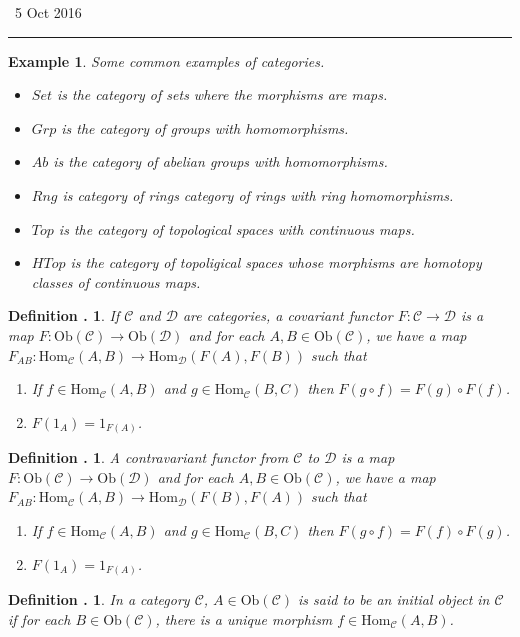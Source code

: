 \documentclass[twoside]{report}
\newcommand{\Ob}{\textrm{Ob}}
\newcommand{\Hom}{\textrm{Hom}}
\newcommand{\fanC}{\mathscr{C}}
\newcommand{\fanD}{\mathscr{D}}
\newcounter{Lecture}
\newcommand{\newLec}[1]{
  \stepcounter{Lecture}
  \noindent{\Large\bf Lecture \arabic{Lecture}} \, #1 \hfill  \rule[1ex]{2.5in}{.1pt} \vspace{1em}
}
\theoremstyle{myts}
\newcounter{c}[Lecture]
\newtheorem{dfn}[c]{Definition \arabic{Lecture}.}
\newtheorem*{epl}{Example}
\newcounter{ex}
\begin{document}
\newLec{5 Oct 2016}

\begin{epl} Some common examples of categories.
  \begin{itemize}
    \item \(Set\) is the category of sets where the morphisms are maps.
    \item \(Grp\) is the category of groups with homomorphisms.
    \item \(Ab\) is the category of abelian groups with homomorphisms.
    \item \(Rng\) is category of rings category of rings with ring homomorphisms.
    \item \(Top\) is the category of topological spaces with continuous maps.
    \item \(HTop\) is the category of topoligical spaces whose morphisms are homotopy classes of continuous maps.
  \end{itemize}
\end{epl}

\begin{dfn}
  If $\fanC$ and $\fanD$ are categories, a \emph{covariant functor} \( F : \fanC \to \fanD \) is a map \( F : \Ob(\fanC) \to \Ob (\fanD) \) and for each \( A, B \in \Ob(\fanC) \), we have a map \( F_{AB} : \Hom_\fanC(A,B) \to \Hom_\fanD(F(A), F(B) ) \) such that
  \begin{enumerate}[(1)]
    \item If \( f\in \Hom_\fanC(A,B) \) and \( g\in \Hom_\fanC (B,C) \) then \( F(g\circ f) = F(g) \circ F(f) \).
    \item \( F(1_A) = 1_{F(A)} \).
  \end{enumerate}
\end{dfn}

\begin{dfn}
  A \emph{contravariant functor} from $\fanC$ to $\fanD$ is a map \( F: \Ob(\fanC) \to \Ob(\fanD) \) and for each \( A, B \in \Ob(\fanC) \), we have a map \( F_{AB} : \Hom_\fanC(A,B) \to \Hom_\fanD(F(B), F(A) ) \) such that
  \begin{enumerate}[(1)]
    \item If \( f\in \Hom_\fanC(A,B) \) and \( g\in \Hom_\fanC (B,C) \) then \( F(g\circ f) = F(f) \circ F(g) \).
    \item \( F(1_A) = 1_{F(A)} \).
  \end{enumerate}
\end{dfn}

\begin{dfn}
  In a category $\fanC$, \( A\in \Ob(\fanC) \) is said to be an \emph{initial object} in $\fanC$ if for each \( B\in \Ob(\fanC) \), there is a unique morphism \( f \in \Hom_\fanC (A,B) \).
\end{dfn}
\end{document}
